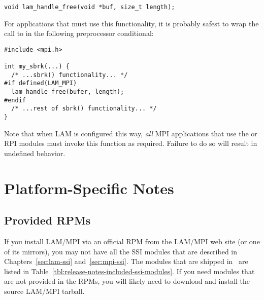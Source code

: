 \lstset{style=lam-c}
\begin{lstlisting}
void lam_handle_free(void *buf, size_t length);
\end{lstlisting}

For applications that must use this functionality, it is probably
safest to wrap the call to  in the
following preprocessor conditional:

\lstset{style=lam-c}
\begin{lstlisting}
#include <mpi.h>

int my_sbrk(...) {
  /* ...sbrk() functionality... */
#if defined(LAM_MPI)
  lam_handle_free(bufer, length);
#endif
  /* ...rest of sbrk() functionality... */
}
\end{lstlisting}

Note that when LAM is configured this way, {\em all} MPI applications
that use the  or  RPI modules must invoke this
function as required.  Failure to do so will result in undefined
behavior. 




\section{Platform-Specific Notes}


\subsection{Provided RPMs}

If you install LAM/MPI via an official RPM from the LAM/MPI web site
(or one of its mirrors), you may not have all the SSI modules that are
described in Chapters~\ref{sec:lam-ssi} and~\ref{sec:mpi-ssi}.  The
modules that are shipped in \lamversion\ are listed in
Table~\ref{tbl:release-notes-included-ssi-modules}.  If you need
modules that are not provided in the RPMs, you will likely need to
download and install the source LAM/MPI tarball.

